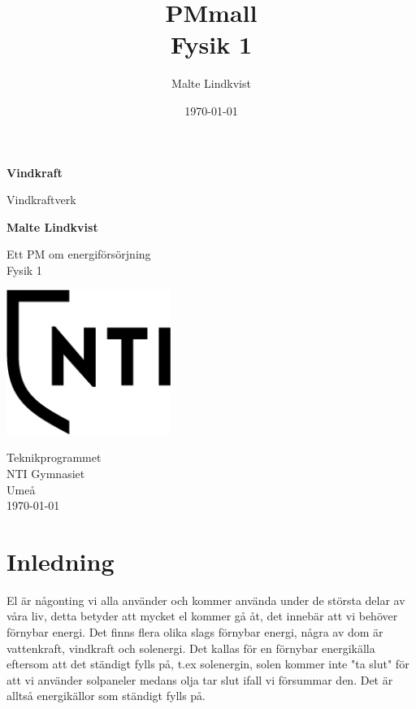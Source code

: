 \documentclass[11p]{article}
\title{PMmall \\ \small Fysik 1}
\author{Malte Lindkvist}
\date{\today}
\begin{document}
    \begin{titlepage}
        \begin{center}
            \vspace*{1cm}

            \Huge
            \textbf{Vindkraft}

            \vspace{0.5cm}
            \LARGE
            Vindkraftverk

            \vspace{1.5cm}

            \textbf{Malte Lindkvist}

            \vfill

            Ett PM om energiförsörjning \\
            Fysik 1

            \vspace{0.8cm}

            \includegraphics[width=0.4\textwidth]{NTI Gymnasiet_Symbol_print_svart.png}

            \Large
            Teknikprogrammet\\
            NTI Gymnasiet\\
            Umeå\\
            \today

        \end{center}
    \end{titlepage}

    \newpage
    \section{Inledning}
    El är någonting vi alla använder och kommer använda under de största delar av våra liv, detta betyder att mycket el kommer gå åt, det innebär att vi behöver förnybar energi.
    Det finns flera olika slags förnybar energi, några av dom är vattenkraft, vindkraft och solenergi. Det kallas för en förnybar energikälla eftersom att det ständigt fylls på, t.ex solenergin, solen kommer inte "ta slut" för att vi använder solpaneler medans olja tar slut ifall vi försummar den. Det är alltså energikällor som ständigt fylls på. \parencite{naturskyddsföreningen}
\end{document}
